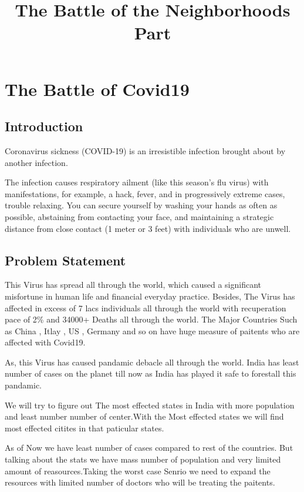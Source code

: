 \documentclass[11pt]{article}
\title{The Battle of the Neighborhoods Part}
\begin{document}
    
    
    \maketitle
    
    

    
    \section{The Battle of Covid19}\label{the-battle-of-covid19}

    \subsection{Introduction}\label{introduction}

    Coronavirus sickness (COVID-19) is an irresistible infection brought
about by another infection.

The infection causes respiratory ailment (like this season's flu virus)
with manifestations, for example, a hack, fever, and in progressively
extreme cases, trouble relaxing. You can secure yourself by washing your
hands as often as possible, abstaining from contacting your face, and
maintaining a strategic distance from close contact (1 meter or 3 feet)
with individuals who are unwell.

    \subsection{Problem Statement}\label{problem-statement}

    This Virus has spread all through the world, which caused a significant
misfortune in human life and financial everyday practice. Besides, The
Virus has affected in excess of 7 lacs individuals all through the world
with recuperation pace of 2\% and 34000+ Deaths all through the world.
The Major Countries Such as China , Itlay , US , Germany and so on have
huge measure of paitents who are affected with Covid19.

As, this Virus has caused pandamic debacle all through the world. India
has least number of cases on the planet till now as India has played it
safe to forestall this pandamic.

We will try to figure out The most effected states in India with more
population and least number number of center.With the Most effected
states we will find most effected citites in that paticular states.

As of Now we have least number of cases compared to rest of the
countries. But talking about the stats we have mass number of population
and very limited amount of reasources.Taking the worst case Senrio we
need to expand the resources with limited number of doctors who will be
treating the paitents.
\end{document}
